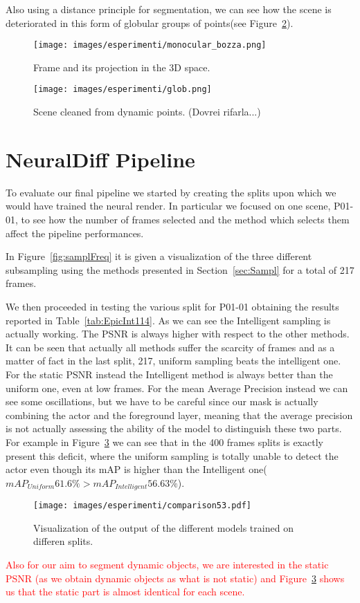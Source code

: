Also using a distance principle for segmentation, we can see how the scene is deteriorated in this form of globular groups of points(see Figure~\ref{fig:glob}).
\begin{figure}
    \centering
    \texttt{[image: images/esperimenti/monocular\_bozza.png]} 
    \caption{Frame and its projection in the 3D space.}\label{fig:Monoc}
\end{figure}
\begin{figure}
    \centering
    \texttt{[image: images/esperimenti/glob.png]} 
    \caption{Scene cleaned from dynamic points. (Dovrei rifarla...)}\label{fig:glob}
\end{figure}



\section{NeuralDiff Pipeline}
To evaluate our final pipeline we started by creating the splits upon which we would have trained the neural render.
In particular we focused on one scene, P01-01, to see how the number of frames selected and the method which 
selects them affect the pipeline performances.

In Figure~\ref{fig:samplFreq} it is given a visualization of the three different subsampling using the methods presented
in Section~\ref{sec:Sampl} for a total of 217 frames.



We then proceeded in testing the various split for P01-01 obtaining the results reported in Table~\ref{tab:EpicInt114}.
As we can see the Intelligent sampling is actually working. The PSNR is always higher with respect to the other methods.
It can be seen that actually all methods suffer the scarcity of frames and as a matter of fact in the last split, 217, 
uniform sampling beats the intelligent one. For the static PSNR instead the Intelligent method is always better
than the uniform one, even at low frames. For the mean Average Precision instead we can see some oscillations,
but we have to be careful since our mask is actually combining the actor and the foreground layer, meaning that 
the average precision is not actually assessing the ability of the model to distinguish these two parts. 
For example in Figure~\ref{fig:comp} we can see that in the 400 frames splits is exactly present this deficit, where the 
uniform sampling is totally unable to detect the actor even though its mAP is higher than the Intelligent 
one($mAP_{Uniform}61.6\% > mAP_{Intelligent}56.63\%$).
\begin{figure}[H]
    \centering
    \texttt{[image: images/esperimenti/comparison53.pdf]} 
    \caption{Visualization of the output of the different models trained on differen splits.}\label{fig:comp}
\end{figure}
\textcolor{red}{Also for our aim to segment dynamic objects, we are interested in the static PSNR (as we obtain dynamic objects as 
what is not static) and Figure~\ref{fig:comp} shows us that the static part is almost identical for each scene.}

